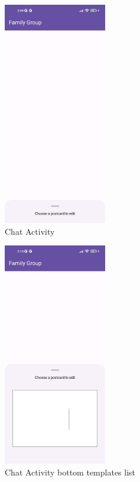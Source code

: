 \begin{figure}[!ht]
	\centering
	\includegraphics[trim={0cm -3cm 0 -3cm}, width=0.4\textwidth]{./Chapter6/Figures/Chat}
	\caption{Chat Activity}
	\label{fig:CVA1}
\end{figure}

\newpage

\begin{figure}[!ht]
	\centering
	\includegraphics[trim={0cm -3cm 0 -3cm}, width=0.4\textwidth]{./Chapter6/Figures/Chat Bottom Sheet}
	\caption{Chat Activity bottom templates list}
	\label{fig:CVA2}
\end{figure}


